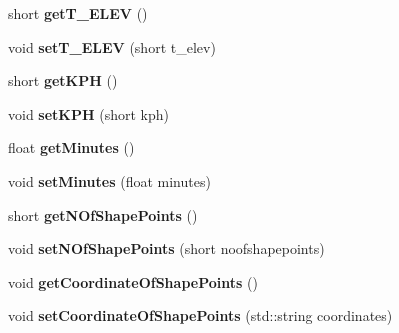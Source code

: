 \begin{DoxyCompactItemize}
\item 
short {\bfseries get\+T\+\_\+\+E\+L\+EV} ()\hypertarget{classF__Network_a9f6bd6625558f4ba35f884bb07fbf804}{}\label{classF__Network_a9f6bd6625558f4ba35f884bb07fbf804}

\item 
void {\bfseries set\+T\+\_\+\+E\+L\+EV} (short t\+\_\+elev)\hypertarget{classF__Network_ac92ab98771376e43cb5ac6969d45c3b5}{}\label{classF__Network_ac92ab98771376e43cb5ac6969d45c3b5}

\item 
short {\bfseries get\+K\+PH} ()\hypertarget{classF__Network_acc344e921e2ec2f5a0d411859c18a589}{}\label{classF__Network_acc344e921e2ec2f5a0d411859c18a589}

\item 
void {\bfseries set\+K\+PH} (short kph)\hypertarget{classF__Network_a5aa0c9cf2d689d902f0f693cbd884f05}{}\label{classF__Network_a5aa0c9cf2d689d902f0f693cbd884f05}

\item 
float {\bfseries get\+Minutes} ()\hypertarget{classF__Network_a737c77f72d5de01b10acac54a04f9b5b}{}\label{classF__Network_a737c77f72d5de01b10acac54a04f9b5b}

\item 
void {\bfseries set\+Minutes} (float minutes)\hypertarget{classF__Network_aaad8d57683988b65fd4dfb02ce9957b4}{}\label{classF__Network_aaad8d57683988b65fd4dfb02ce9957b4}

\item 
short {\bfseries get\+N\+Of\+Shape\+Points} ()\hypertarget{classF__Network_a2812d4cb133f012e566c276e9b0b3634}{}\label{classF__Network_a2812d4cb133f012e566c276e9b0b3634}

\item 
void {\bfseries set\+N\+Of\+Shape\+Points} (short noofshapepoints)\hypertarget{classF__Network_ac26be411631fe2f241d83fc67abe1db9}{}\label{classF__Network_ac26be411631fe2f241d83fc67abe1db9}

\item 
void {\bfseries get\+Coordinate\+Of\+Shape\+Points} ()\hypertarget{classF__Network_a925c18898e8593444aff5f825beab20d}{}\label{classF__Network_a925c18898e8593444aff5f825beab20d}

\item 
void {\bfseries set\+Coordinate\+Of\+Shape\+Points} (std\+::string coordinates)\hypertarget{classF__Network_ac1e751920b594fb7326f1bbb4656cfad}{}\label{classF__Network_ac1e751920b594fb7326f1bbb4656cfad}


\end{DoxyCompactItemize}
